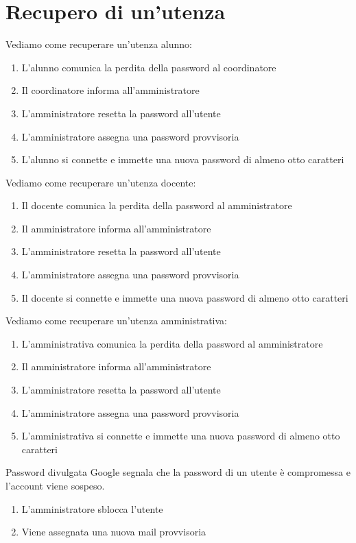 \documentclass[structure=book,  
pagelayout=standard,defaultfont=cochineal,partialtoc]{suftesi}
\begin{document}
\section{Recupero di un'utenza}
Vediamo come recuperare un'utenza alunno:
\begin{enumerate}
	\item L'alunno comunica la perdita della password al coordinatore
	\item Il coordinatore informa all'amministratore
	\item L'amministratore resetta la password all'utente
	\item L'amministratore assegna una password provvisoria 
	\item L'alunno si connette e immette una nuova password di almeno otto 
	caratteri 
\end{enumerate}
Vediamo come recuperare un'utenza docente:
\begin{enumerate}
	\item Il docente comunica la perdita della password al amministratore
	\item Il amministratore informa all'amministratore
	\item L'amministratore resetta la password all'utente
	\item L'amministratore assegna una password provvisoria 
	\item Il docente si connette e immette una nuova password di almeno otto 
	caratteri 
\end{enumerate}
Vediamo come recuperare un'utenza amministrativa:
\begin{enumerate}
	\item L'amministrativa comunica la perdita della password al amministratore
	\item Il amministratore informa all'amministratore
	\item L'amministratore resetta la password all'utente
	\item L'amministratore assegna una password provvisoria 
	\item L'amministrativa si connette e immette una nuova password di almeno 
	otto 
	caratteri 
\end{enumerate}
Password divulgata Google segnala che la password di un utente è compromessa e 
l'account viene sospeso.
\begin{enumerate}
	\item L'amministratore sblocca l'utente
	\item Viene assegnata una nuova mail provvisoria 
\end{enumerate}
\nocite{*}
\printbibliography
\end{document}

